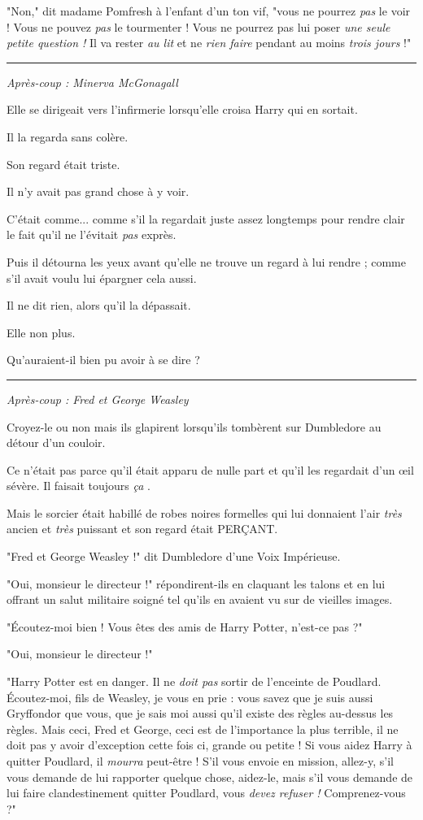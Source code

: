 "Non," dit madame Pomfresh à l'enfant d'un ton vif, "vous ne pourrez \emph{pas}  le voir ! Vous ne pouvez \emph{pas } le tourmenter ! Vous ne pourrez pas lui poser \emph{une seule petite question ! } Il va rester \emph{au lit}  et ne \emph{rien faire}  pendant au moins \emph{trois jours } !"
\par\noindent\rule{\textwidth}{0.4pt}
\emph{Après-coup : Minerva McGonagall} 

Elle se dirigeait vers l'infirmerie lorsqu'elle croisa Harry qui en sortait.

Il la regarda sans colère.

Son regard était triste.

Il n'y avait pas grand chose à y voir.

C'était comme... comme s'il la regardait juste assez longtemps pour rendre clair le fait qu'il ne l'évitait \emph{pas}  exprès.

Puis il détourna les yeux avant qu'elle ne trouve un regard à lui rendre ; comme s'il avait voulu lui épargner cela aussi.

Il ne dit rien, alors qu'il la dépassait.

Elle non plus.

Qu'auraient-il bien pu avoir à se dire ?
\par\noindent\rule{\textwidth}{0.4pt}
\emph{Après-coup : Fred et George Weasley} 

Croyez-le ou non mais ils glapirent lorsqu'ils tombèrent sur Dumbledore au détour d'un couloir.

Ce n'était pas parce qu'il était apparu de nulle part et qu'il les regardait d'un œil sévère. Il faisait toujours \emph{ça} .

Mais le sorcier était habillé de robes noires formelles qui lui donnaient l'air \emph{très } ancien et \emph{très}  puissant et son regard était PERÇANT.

"Fred et George Weasley !" dit Dumbledore d'une Voix Impérieuse.

"Oui, monsieur le directeur !" répondirent-ils en claquant les talons et en lui offrant un salut militaire soigné tel qu'ils en avaient vu sur de vieilles images.

"Écoutez-moi bien ! Vous êtes des amis de Harry Potter, n'est-ce pas ?"

"Oui, monsieur le directeur !"

"Harry Potter est en danger. Il ne \emph{doit pas } sortir de l'enceinte de Poudlard. Écoutez-moi, fils de Weasley, je vous en prie : vous savez que je suis aussi Gryffondor que vous, que je sais moi aussi qu'il existe des règles au-dessus les règles. Mais ceci, Fred et George, ceci est de l'importance la plus terrible, il ne doit pas y avoir d'exception cette fois ci, grande ou petite ! Si vous aidez Harry à quitter Poudlard, il \emph{mourra } peut-être ! S'il vous envoie en mission, allez-y, s'il vous demande de lui rapporter quelque chose, aidez-le, mais s'il vous demande de lui faire clandestinement quitter Poudlard, vous \emph{devez refuser ! } Comprenez-vous ?"


